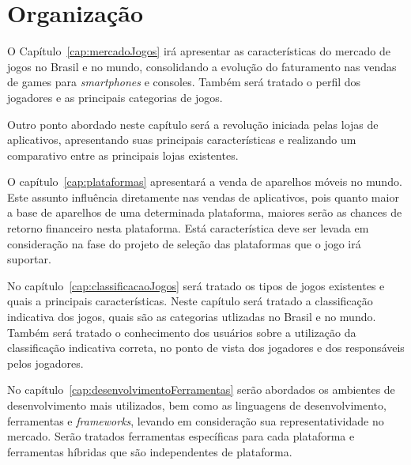 
\section{Organização}


O Capítulo~\ref{cap:mercadoJogos} irá apresentar as características do mercado de jogos no Brasil e no mundo, consolidando a evolução do faturamento nas vendas de games para \emph{smartphones} e consoles. Também será tratado o perfil dos jogadores e as principais categorias de jogos.

Outro ponto abordado neste capítulo será a revolução iniciada pelas lojas de aplicativos, apresentando suas principais características e realizando um comparativo entre as principais lojas existentes.




O capítulo~\ref{cap:plataformas} apresentará a venda de aparelhos móveis no mundo. Este assunto influência diretamente nas vendas de aplicativos, pois quanto maior a base de aparelhos de uma determinada plataforma, maiores serão as chances de retorno financeiro nesta plataforma. Está característica deve ser levada em consideração na fase do projeto de seleção das plataformas que o jogo irá suportar.






No capítulo~\ref{cap:classificacaoJogos} será tratado os tipos de jogos existentes e quais a principais características.
Neste capítulo será tratado a classificação indicativa dos jogos, quais são as categorias utlizadas no Brasil e no mundo. Também será tratado o conhecimento dos usuários sobre a utilização da classificação indicativa correta, no ponto de vista dos jogadores e dos responsáveis pelos jogadores.



No capítulo~\ref{cap:desenvolvimentoFerramentas} serão abordados os ambientes de desenvolvimento mais utilizados, bem como as linguagens de desenvolvimento, ferramentas e \emph{frameworks}, levando em consideração sua representatividade no mercado. Serão tratados ferramentas específicas para cada plataforma e ferramentas híbridas que são independentes de plataforma.


